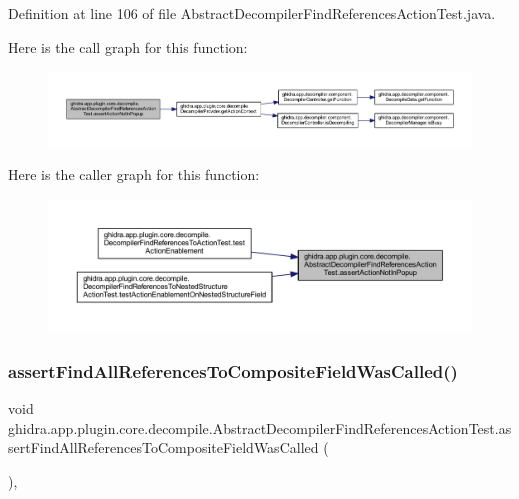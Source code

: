 Definition at line 106 of file Abstract\+Decompiler\+Find\+References\+Action\+Test.\+java.

Here is the call graph for this function\+:
\nopagebreak
\begin{figure}[H]
\begin{center}
\leavevmode
\includegraphics[width=350pt]{classghidra_1_1app_1_1plugin_1_1core_1_1decompile_1_1_abstract_decompiler_find_references_action_test_aa9abfadbd327de808a621ef3a7b1e896_cgraph}
\end{center}
\end{figure}
Here is the caller graph for this function\+:
\nopagebreak
\begin{figure}[H]
\begin{center}
\leavevmode
\includegraphics[width=350pt]{classghidra_1_1app_1_1plugin_1_1core_1_1decompile_1_1_abstract_decompiler_find_references_action_test_aa9abfadbd327de808a621ef3a7b1e896_icgraph}
\end{center}
\end{figure}
\mbox{\label{classghidra_1_1app_1_1plugin_1_1core_1_1decompile_1_1_abstract_decompiler_find_references_action_test_ab9649213e2f76913f52fcbb9bf2c602b}} 
\subsubsection{\texorpdfstring{assertFindAllReferencesToCompositeFieldWasCalled()}{assertFindAllReferencesToCompositeFieldWasCalled()}}
{\footnotesize\ttfamily void ghidra.\+app.\+plugin.\+core.\+decompile.\+Abstract\+Decompiler\+Find\+References\+Action\+Test.\+assert\+Find\+All\+References\+To\+Composite\+Field\+Was\+Called (\begin{DoxyParamCaption}{ }\end{DoxyParamCaption})\hspace{0.3cm}{\ttfamily [inline]}, {\ttfamily [protected]}}



